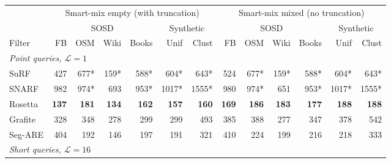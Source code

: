 \begin{table}[H]
    \centering
    \footnotesize
    \setlength{\tabcolsep}{4pt}
    \begin{tabular}{@{}lrrrrrr|rrrrrr@{}}
        \toprule
        & \multicolumn{6}{c|}{Smart-mix empty (with truncation)} & \multicolumn{6}{c}{Smart-mix mixed (no truncation)} \\
        \cmidrule(lr){2-7} \cmidrule(lr){8-13}
        & \multicolumn{4}{c}{SOSD} & \multicolumn{2}{c|}{Synthetic} & \multicolumn{4}{c}{SOSD} & \multicolumn{2}{c}{Synthetic} \\
        \cmidrule(lr){2-5} \cmidrule(lr){6-7} \cmidrule(lr){8-11} \cmidrule(lr){12-13}
        Filter  & FB           & OSM              & Wiki             & Books            & Unif             & Clust            & FB           & OSM              & Wiki             & Books            & Unif             & Clust            \\
        \midrule
        \multicolumn{13}{l}{\textit{Point queries, $\mathcal{L} = 1$}} \\
        \midrule
        SuRF    & 427          & 677*             & 159*             & 588*             & 604*             & 643*             & 524          & 677*             & 159*             & 588*             & 604*             & 643*             \\
        SNARF   & 982          & 974*             & 693              & 953*             & 1017*            & 1555*            & 980          & 974*             & 651              & 953*             & 1017*            & 1555*            \\
        Rosetta & \textbf{137} & \textbf{181}     & \textbf{134}     & \textbf{162}     & \textbf{157}     & \textbf{160}     & \textbf{169} & \textbf{186}     & \textbf{183}     & \textbf{177}     & \textbf{188}     & \textbf{188}     \\
        Grafite & 328          & 348              & 278              & 299              & 299              & 493              & 385          & 388              & 277              & 347              & 378              & 542              \\
        Seg-ARE & 404          & 192              & 146              & 197              & 191              & 321              & 410          & 224              & 199              & 216              & 218              & 333              \\
        \midrule
        \multicolumn{13}{l}{\textit{Short queries, $\mathcal{L} = 16$}} \\

\end{tabular}
\end{table}
